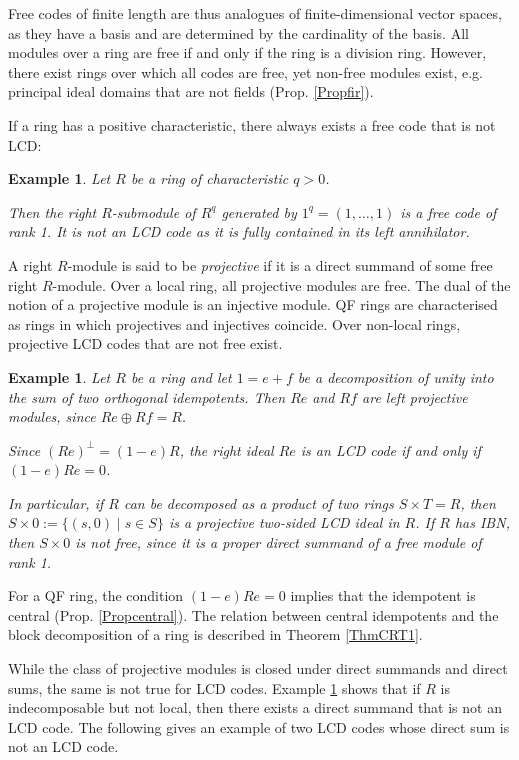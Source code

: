 \documentclass{article}
\theoremstyle{plain}
\newtheorem{Ex}[veta]{Example}
\theoremstyle{plain}
\theoremstyle{remark}
\theoremstyle{plain}
\begin{document}
 Free codes of finite length are thus analogues of finite-dimensional vector spaces, as they have a basis and are determined by the cardinality of the basis. All modules over a ring are free if and only if the ring is a division ring. However, there exist rings over which all codes are free, yet non-free modules exist, e.g. principal ideal domains  that are not fields (Prop. \ref{Propfir}).

 If a ring has a positive characteristic, there always exists a free code that is not LCD:
\begin{Ex}\label{ExFreeNotLCD}
    Let $R$ be a ring of characteristic $q>0$.

    Then the right $R$-submodule of $R^q$ generated by $1^q=(1, \dots, 1)$ is a free code of rank 1. It is not an LCD code as it is fully contained in its left annihilator. 
\end{Ex}

A right $R$-module is said to be \textit{projective} if it is a direct summand of some free right $R$-module.  Over a local ring, all projective modules are free.  The dual of the notion of a projective module is an injective module. QF rings are characterised as rings in which projectives and injectives coincide. Over non-local rings, projective LCD codes that are not free exist.

\begin{Ex}\label{ExProjLCD}
    Let $R$ be a ring and let $1=e+f$ be a decomposition of unity into the sum of two orthogonal idempotents. Then $Re$ and $Rf$ are left projective modules, since $Re\oplus Rf=R$.

   Since $(Re)^\perp=(1-e)R$, the right ideal $Re$ is an LCD code if and only if $(1-e)Re=0$.

    In particular, if $R$ can be decomposed as a product of two rings $S\times T=R$, then $S\times 0:=\{(s,0)\mid s\in S\}$ is a projective two-sided LCD ideal in $R$. If $R$ has IBN, then $S\times 0$ is not free, since it is a proper direct summand of a free module of rank 1.
\end{Ex}
For a QF ring, the condition $(1-e)Re=0$ implies that the idempotent is central (Prop. \ref{Propcentral}). The relation between central idempotents and the block decomposition of a ring is described in Theorem \ref{ThmCRT1}.

While the class of projective modules is closed under direct summands and direct sums, the same is not true for LCD codes. Example \ref{ExProjLCD} shows that if $R$ is indecomposable but not local, then there exists a direct summand that is not an LCD code. The following gives an example of two LCD codes whose direct sum is not an LCD code.
\end{document}
